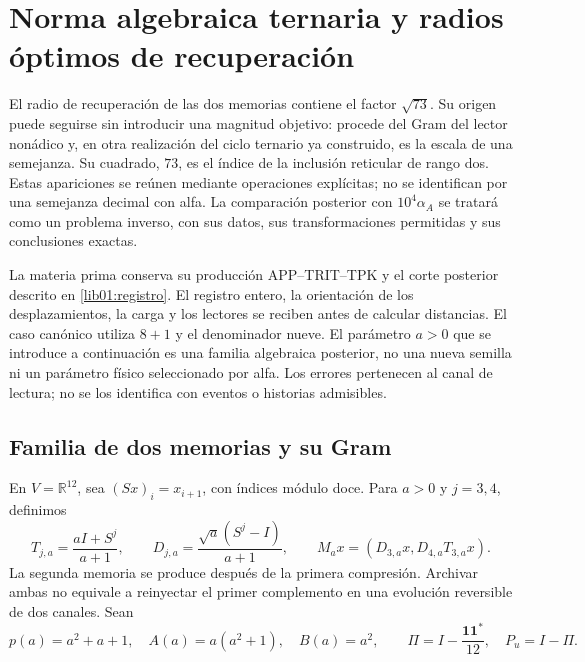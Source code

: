 \section{Norma algebraica ternaria y radios óptimos de recuperación}
\label{lib02:norma-ternaria}

El radio de recuperación de las dos memorias contiene el factor
\(\sqrt{73}\). Su origen puede seguirse sin introducir una magnitud
objetivo: procede del Gram del lector nonádico y, en otra realización del
ciclo ternario ya construido, es la escala de una semejanza. Su cuadrado,
\(73\), es el índice de la inclusión reticular de rango dos. Estas
apariciones se reúnen mediante operaciones explícitas;
no se identifican por una semejanza decimal con alfa. La comparación
posterior con \(10^4\alpha_A\) se tratará como un problema inverso,
con sus datos, sus transformaciones permitidas y sus conclusiones exactas.

La materia prima conserva su producción APP--TRIT--TPK y el corte
posterior descrito en \cref{lib01:registro}. El registro entero, la
orientación de los desplazamientos, la carga y los lectores se reciben
antes de calcular distancias. El caso canónico utiliza \(8+1\) y el
denominador nueve. El parámetro \(a>0\) que se introduce a continuación
es una familia algebraica posterior, no una nueva semilla ni un parámetro
físico seleccionado por alfa. Los errores pertenecen al canal de lectura;
no se los identifica con eventos o historias admisibles.

\subsection{Familia de dos memorias y su Gram}
\label{lib02:familia-memoria}

En \(V=\mathbb R^{12}\), sea \((Sx)_i=x_{i+1}\), con índices módulo
doce. Para \(a>0\) y \(j=3,4\), definimos
\begin{equation}
 T_{j,a}=\frac{aI+S^j}{a+1},\qquad
 D_{j,a}=\frac{\sqrt a(S^j-I)}{a+1},\qquad
 M_ax=(D_{3,a}x,D_{4,a}T_{3,a}x).
 \label{lib02:lectores}
\end{equation}
La segunda memoria se produce después de la primera compresión. Archivar
ambas no equivale a reinyectar el primer complemento en una evolución
reversible de dos canales. Sean
\[
 p(a)=a^2+a+1,\quad A(a)=a(a^2+1),\quad B(a)=a^2,
 \qquad\Pi=I-\frac{\mathbf1\mathbf1^*}{12},\quad P_u=I-\Pi.
\]

